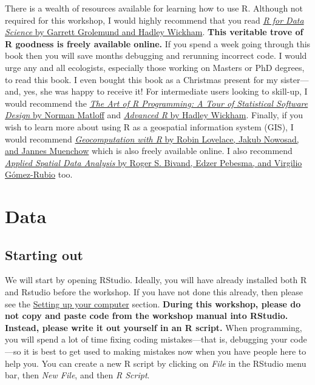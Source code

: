 \documentclass[
  12pt,
]{book}
\begin{document}
There is a wealth of resources available for learning how to use R. Although not required for this workshop, I would highly recommend that you read \href{https://r4ds.had.co.nz/}{\emph{R for Data Science} by Garrett Grolemund and Hadley Wickham}. \textbf{This veritable trove of R goodness is freely available online.} If you spend a week going through this book then you will save months debugging and rerunning incorrect code. I would urge any and all ecologists, especially those working on Masters or PhD degrees, to read this book. I even bought this book as a Christmas present for my sister---and, yes, she was happy to receive it! For intermediate users looking to skill-up, I would recommend the \href{http://shop.oreilly.com/product/9781593273842.do}{\emph{The Art of R Programming: A Tour of Statistical Software Design} by Norman Matloff} and \href{https://adv-r.hadley.nz/}{\emph{Advanced R} by Hadley Wickham}. Finally, if you wish to learn more about using R as a geospatial information system (GIS), I would recommend \href{https://geocompr.robinlovelace.net/}{\emph{Geocomputation with R} by Robin Lovelace, Jakub Nowosad, and Jannes Muenchow} which is also freely available online. I also recommend \href{https://www.springer.com/gp/book/9781461476177}{\emph{Applied Spatial Data Analysis} by Roger S. Bivand, Edzer Pebesma, and Virgilio Gómez-Rubio} too.

\hypertarget{data}{%
\chapter{Data}\label{data}}

\hypertarget{starting-out}{%
\section{Starting out}\label{starting-out}}

We will start by opening RStudio. Ideally, you will have already installed both R and Rstudio before the workshop. If you have not done this already, then please see the \protect\hyperlink{setup}{Setting up your computer} section. \textbf{During this workshop, please do not copy and paste code from the workshop manual into RStudio. Instead, please write it out yourself in an R script.} When programming, you will spend a lot of time fixing coding mistakes---that is, debugging your code---so it is best to get used to making mistakes now when you have people here to help you. You can create a new R script by clicking on \emph{File} in the RStudio menu bar, then \emph{New File}, and then \emph{R Script}.
\end{document}
